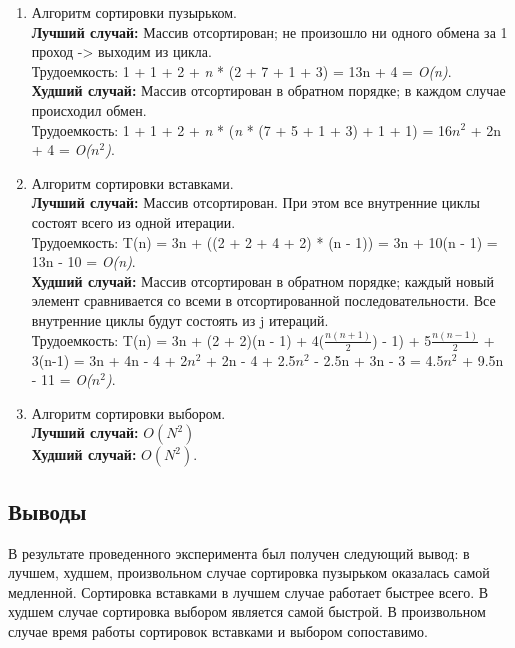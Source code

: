 \documentclass[a4paper,12pt]{article}
\begin{document}
	\begin{enumerate}
		\item Алгоритм сортировки пузырьком. \\
		\hspace*{5mm} {\bf Лучший случай: } Массив отсортирован; не произошло ни одного обмена за 1 проход -> выходим из цикла.
		\\ Трудоемкость: 1 + 1 + 2 + {\it n} * (2 + 7 + 1 + 3) = 13n + 4 = {\it O(n)}.
		\\ \hspace*{5mm} {\bf Худший случай: } Массив отсортирован в обратном порядке; в каждом случае происходил обмен.
		\\ Трудоемкость: 1 + 1 + 2 + {\it n} * ({\it n} * (7 + 5 + 1 + 3) + 1 + 1) = 16$n^2$ + 2n + 4 = {\it O($n^2$)}.
		\item Алгоритм сортировки вставками.\\
		\hspace*{5mm} {\bf Лучший случай: } Массив отсортирован. При этом все внутренние циклы состоят всего из одной итерации.
		\\ Трудоемкость: T(n) = 3n + ((2 + 2 + 4 + 2) * (n - 1)) = 3n + 10(n - 1) = 13n - 10 = {\it O(n)}.
		\\ \hspace*{5mm} {\bf Худший случай: } Массив отсортирован в обратном порядке; каждый новый элемент сравнивается со всеми в отсортированной последовательности. Все внутренние циклы будут состоять из j итераций.
		\\ Трудоемкость:  T(n) = 3n + (2 + 2)(n - 1) + 4($\frac{n(n+1)}{2}$) - 1) + 5$\frac{n(n-1)}{2}$ + 3(n-1) = 3n + 4n - 4 + 2$n^2$ + 2n - 4 + 2.5$n^2$ - 2.5n + 3n - 3 = 4.5$n^2$ + 9.5n - 11 = {\it O($n^2$)}.
		
		\item Алгоритм сортировки выбором.\\
		\hspace*{5mm} {\bf Лучший случай: } $O(N^{2})$
		\\ \hspace*{5mm} {\bf Худший случай: } $O(N^{2})$.	
	\end{enumerate}	
	
	\subsection{Выводы}
	\hfill

	В результате проведенного эксперимента был получен следующий вывод: в лучшем, худшем, произвольном случае сортировка пузырьком оказалась самой медленной. Сортировка вставками в лучшем случае работает быстрее всего. В худшем случае сортировка выбором является самой быстрой. В произвольном случае время работы сортировок вставками и выбором сопоставимо.
	
\end{document}
